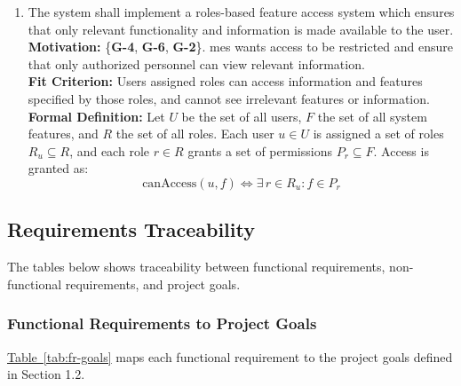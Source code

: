 \documentclass[12pt]{article}
\begin{document}
\begin{enumerate}[align=left,
  leftmargin=*,
  labelsep=1em,
  itemindent=0em,
  label=\bfseries FR-\arabic*:,
  ref=\bfseries FR-\arabic*]
    once an event has completed.\\[2mm]
  {\bf Motivation:} \{\textbf{G-5}, \textbf{G-4}, \textbf{G-3}\}. See \ref{FR9}.\\
  {\bf Fit Criterion:} See \ref{FR9}.
  \item \label{FR11} The system shall implement a roles-based feature access system which ensures that only relevant
    functionality and information is made available to the user.\\[2mm]
    {\bf Motivation:} \{{\bf G-4}, {\bf G-6}, {\bf G-2}\}. \Gls{mes} wants access to be restricted and ensure that
    only authorized personnel can view relevant information.\\
    {\bf Fit Criterion:} Users assigned roles can access information and features specified by those roles, and cannot
    see irrelevant features or information. \\ 
    {\bf Formal Definition:} Let $U$ be the set of all users, $F$ the set of all system features, 
  and $R$ the set of all roles. Each user $u \in U$ is assigned a set of roles $R_u \subseteq R$, 
  and each role $r \in R$ grants a set of permissions $P_r \subseteq F$. Access is granted as:
  \[
    \text{canAccess}(u, f) \iff \exists\, r \in R_u : f \in P_r
  \]
\end{enumerate}

\subsection{Requirements Traceability}

The tables below shows traceability between functional requirements,
non-functional requirements, and project goals.

\subsubsection*{Functional Requirements to Project Goals}

\hyperref[tab:fr-goals]{Table~\ref{tab:fr-goals}} maps each functional requirement to the
project goals defined in Section 1.2.
\end{document}
